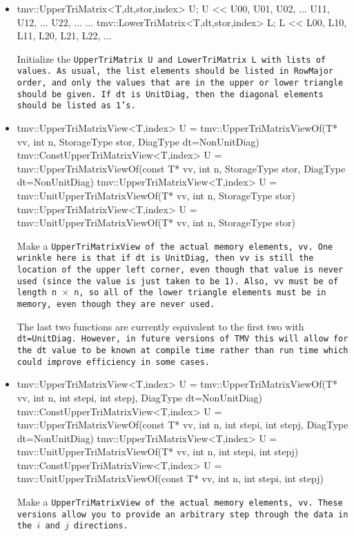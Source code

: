 \begin{itemize}
\vspace{1 in}
\item
\begin{tmvcode}
tmv::UpperTriMatrix<T,dt,stor,index> U;
U << U00, U01, U02, ...
          U11, U12, ...
               U22, ...
                    ...
tmv::LowerTriMatrix<T,dt,stor,index> L;
L << L00,
     L10, L11, 
     L20, L21, L22,
     ...
\end{tmvcode}
Initialize the \tt{UpperTriMatrix U} and \tt{LowerTriMatrix L} with lists of values.  As usual, the 
list elements should be listed in RowMajor order, and only the values that are in the upper or
lower triangle should be given.  If \tt{dt} is \tt{UnitDiag}, then the diagonal elements should be 
listed as 1's.
\item
\begin{tmvcode}
tmv::UpperTriMatrixView<T,index> U = 
      tmv::UpperTriMatrixViewOf(T* vv, int n, 
      StorageType stor, DiagType dt=NonUnitDiag)
tmv::ConstUpperTriMatrixView<T,index> U = 
      tmv::UpperTriMatrixViewOf(const T* vv, int n, 
      StorageType stor, DiagType dt=NonUnitDiag)
tmv::UpperTriMatrixView<T,index> U = 
      tmv::UnitUpperTriMatrixViewOf(T* vv, int n, 
      StorageType stor)
tmv::UpperTriMatrixView<T,index> U = 
      tmv::UnitUpperTriMatrixViewOf(T* vv, int n, 
      StorageType stor)
\end{tmvcode}
Make a \tt{UpperTriMatrixView} of the actual memory elements, \tt{vv}.
One wrinkle here is that if \tt{dt} is \tt{UnitDiag}, then 
\tt{vv} is still the location of the
upper left corner, even though that value is never used 
(since the value is just taken to
be 1).  Also, \tt{vv} must be of length \tt{n} $\times$ \tt{n},
so all of the lower triangle
elements must be in memory, even though they are never used.

The last two functions are currently equivalent to the first two with \tt{dt=UnitDiag}.
However, in future versions of TMV this will allow for the \tt{dt} value to be 
known at compile time rather than run time which could improve efficiency
in some cases.

\item
\begin{tmvcode}
tmv::UpperTriMatrixView<T,index> U = 
      tmv::UpperTriMatrixViewOf(T* vv, int n, 
      int stepi, int stepj, DiagType dt=NonUnitDiag)
tmv::ConstUpperTriMatrixView<T,index> U = 
      tmv::UpperTriMatrixViewOf(const T* vv, int n, 
      int stepi, int stepj, DiagType dt=NonUnitDiag)
tmv::UpperTriMatrixView<T,index> U = 
      tmv::UnitUpperTriMatrixViewOf(T* vv, int n, 
      int stepi, int stepj)
tmv::ConstUpperTriMatrixView<T,index> U = 
      tmv::UnitUpperTriMatrixViewOf(const T* vv, int n, 
      int stepi, int stepj)
\end{tmvcode}
Make a \tt{UpperTriMatrixView} of the actual memory elements, \tt{vv}.
These versions allow you to provide an arbitrary step through the data in 
the $i$ and $j$ directions. 
\end{itemize}

